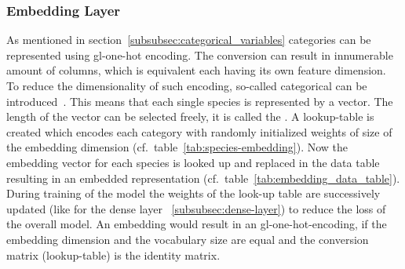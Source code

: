 \subsubsection{Embedding Layer}
\label{subsubsec:embedding-layer}

As mentioned in section~\ref{subsubsec:categorical_variables} categories can be represented using \gls{gl-one-hot} encoding.
The conversion can result in innumerable amount of columns, which is equivalent each having its own feature dimension.
To reduce the dimensionality of such encoding, so-called categorical  can be introduced~\cite{brownlee2021}.
This means that each single species is represented by a vector.
The length of the vector can be selected freely, it is called the .
A lookup-table is created which encodes each category with randomly initialized weights of size of the embedding dimension (cf.\ table~\ref{tab:species-embedding}).
Now the embedding vector for each species is looked up and replaced in the data table resulting in an embedded representation (cf.\ table~\ref{tab:embedding_data_table}).
During training of the model the weights of the look-up table are successively updated (like for the dense layer ~\ref{subsubsec:dense-layer}) to reduce the loss of the overall model.
An embedding would result in an \gls{gl-one-hot}-encoding, if the embedding dimension and the vocabulary size are equal and the conversion matrix (lookup-table) is the identity matrix.

